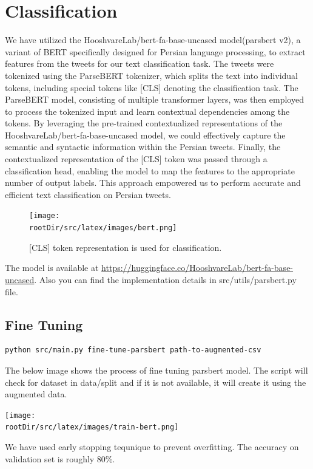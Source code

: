\documentclass[12pt, letterpaper]{article}
\def\rootDir{../..}
\begin{document}
    \section{Classification}\label{sec:classification}
    We have utilized the HooshvareLab/bert-fa-base-uncased model(parsbert v2), a variant of BERT specifically designed for Persian language processing, to extract features from the tweets for our text classification task. 
    The tweets were tokenized using the ParseBERT tokenizer, which splits the text into individual tokens, including special tokens like [CLS] denoting the classification task. 
    The ParseBERT model, consisting of multiple transformer layers, was then employed to process the tokenized input and learn contextual dependencies among the tokens. By leveraging the pre-trained contextualized representations of the HooshvareLab/bert-fa-base-uncased model, we could effectively capture the semantic and syntactic information within the Persian tweets. Finally, the contextualized representation of the [CLS] token was passed through a classification head, enabling the model to map the features to the appropriate number of output labels. This approach empowered us to perform accurate and efficient text classification on Persian tweets.
    \begin{figure}[H]
        \begin{center}
            \texttt{[image: \\rootDir/src/latex/images/bert.png]}
        \end{center}
        \caption{[CLS] token representation is used for classification.}
    \end{figure}
    The model is available at \url{https://huggingface.co/HooshvareLab/bert-fa-base-uncased}. Also you can find the implementation details in src\slash utils\slash parsbert.py file.
    \subsection{Fine Tuning}\label{subsec:fine-tuning}
    \begin{lstlisting}[language=bash]
    python src/main.py fine-tune-parsbert path-to-augmented-csv
    \end{lstlisting}
    The below image shows the process of fine tuning parsbert model. The script will check for dataset in data\slash split and if it is not available, it will create it using the augmented data.
    \begin{center}
        \texttt{[image: \\rootDir/src/latex/images/train-bert.png]}
    \end{center}
    We have used early stopping tequnique to prevent overfitting. The accuracy on validation set is roughly 80\%. 
    
\end{document}

